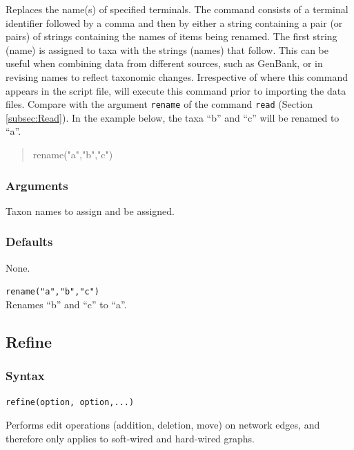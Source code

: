 	\begin{phygdescription}
	{Replaces the name(s) of specified terminals. 
	The command consists of a terminal identifier followed by a comma and then by either 
	a string containing a pair (or pairs) of strings containing the names of items being renamed.
	The first string (name) is assigned to taxa with the strings (names) that follow. This can be 
	useful when combining data from different sources, such as GenBank, or in revising names 
	to reflect taxonomic changes. Irrespective of where this command appears in the script file, 
	\phyg will execute this command prior to importing the data files. Compare with the 
	argument \texttt{rename} of the command \texttt{read} (Section \ref{subsec:Read}).
	In the example below, the taxa ``b'' and ``c'' will be renamed to ``a''.

	\begin{quote}
	rename("a","b","c")
	\end{quote}}
	\end{phygdescription}
	
	\subsubsection{Arguments}
		Taxon names to assign and be assigned.
		
	\subsubsection{Defaults}
		None.
		
	\begin{example}
	
		\item{\texttt{rename("a","b","c")}\\ Renames ``b'' and ``c'' to ``a''. }
				
	\end{example}

\subsection{Refine}
	\subsubsection{Syntax}
		\texttt{refine(option, option,...)}
		
	\begin{phygdescription}
		{Performs edit operations (addition, deletion, move) on network edges, and therefore
		only applies to soft-wired and hard-wired graphs.}
	\end{phygdescription}

